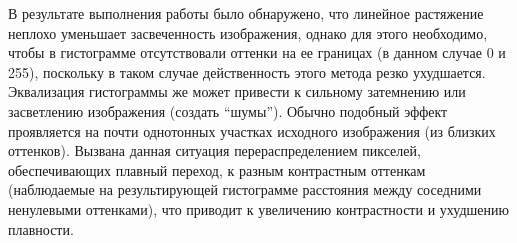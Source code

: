 В результате выполнения работы было обнаружено, что линейное растяжение неплохо уменьшает засвеченность изображения, однако для этого необходимо, чтобы в гистограмме отсутствовали оттенки на ее границах (в данном случае 0 и 255), поскольку в таком случае действенность этого метода резко ухудшается. Эквализация гистограммы же может привести к сильному затемнению или засветлению изображения (создать "`шумы"'). Обычно подобный эффект проявляется на почти однотонных участках исходного изображения (из близких оттенков). Вызвана данная ситуация перераспределением пикселей, обеспечивающих плавный переход, к разным контрастным оттенкам (наблюдаемые на результирующей гистограмме расстояния между соседними ненулевыми оттенками), что приводит к увеличению контрастности и ухудшению плавности. 